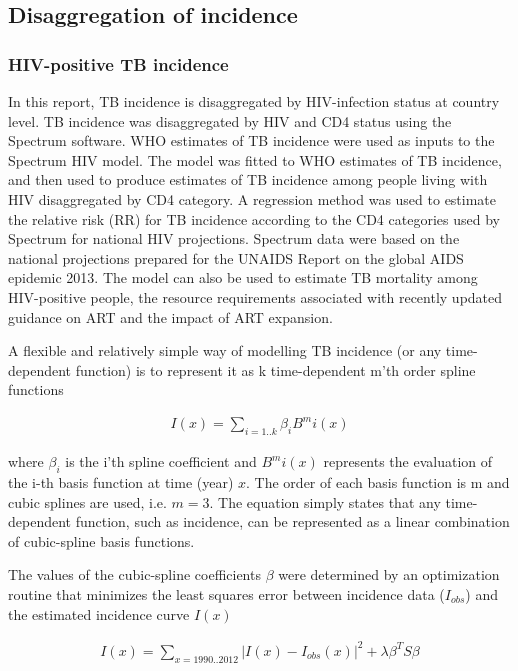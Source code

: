 \subsection{Disaggregation of incidence}
\subsubsection{HIV-positive TB incidence}

In this report, TB incidence is disaggregated by HIV-infection status at country level. TB incidence was disaggregated by HIV and CD4 status using the Spectrum software\cite{Stover2012}. WHO estimates of TB incidence were used as inputs to the Spectrum HIV model. The model was fitted to WHO estimates of TB incidence, and then used to produce estimates of TB incidence among people living with HIV disaggregated by CD4 category\cite{Pretorius2014}. A regression method was used to estimate the relative risk (RR) for TB incidence according to the CD4 categories used by Spectrum for national HIV projections\cite{J2010}. Spectrum data were based on the national projections prepared for the UNAIDS Report on the global AIDS epidemic 2013. The model can also be used to  estimate TB mortality among HIV-positive people, the resource requirements associated with  recently updated guidance on ART and the impact of ART expansion. 

A flexible and relatively simple way of modelling TB incidence (or any time-dependent function) is to represent it as k time-dependent m’th order spline functions

\begin{align*}
I(x) = \sum_{i=1 .. k} \beta_i B^m i(x)
\end{align*}

where $\beta_i$ is the i'th spline coefficient and $B^m i(x)$ represents the evaluation of the i-th basis function at time (year) $x$. The order of each basis function is m and cubic splines are used, i.e. $m=3$. The equation simply states that any time-dependent function, such as incidence, can be represented as a linear combination of cubic-spline basis functions.

The values of the cubic-spline coefficients $\beta$ were determined by an optimization routine that minimizes the least squares error between incidence data ($I_{obs}$) and the estimated incidence curve $I(x)$

\begin{align*}
I(x) = \sum_{x = 1990 .. 2012} | I(x) - I_{obs} (x)|^2 + \lambda \beta^T S \beta
\end{align*}

